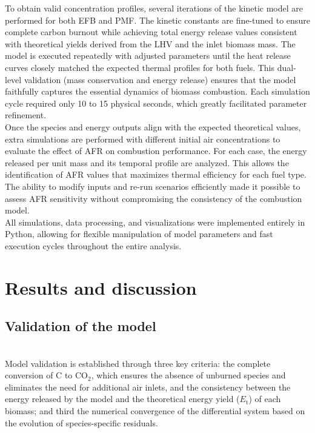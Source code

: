 \documentclass[preprint,12pt]{elsarticle}
\begin{document}
To obtain valid concentration profiles, several iterations of the kinetic model are performed for both EFB and PMF. The kinetic constants are fine-tuned to ensure complete carbon burnout while achieving total energy release values consistent with theoretical yields derived from the LHV and the inlet biomass mass. The model is executed repeatedly with adjusted parameters until the heat release curves closely matched the expected thermal profiles for both fuels. This dual-level validation (mass conservation and energy release) ensures that the model faithfully captures the essential dynamics of biomass combustion. Each simulation cycle required only 10 to 15 physical seconds, which greatly facilitated parameter refinement.\\

Once the species and energy outputs align with the expected theoretical values, extra simulations are performed with different initial air concentrations to evaluate the effect of AFR on combustion performance. For each case, the energy released per unit mass and its temporal profile are analyzed. This allows the identification of AFR values that maximizes thermal efficiency for each fuel type. The ability to modify inputs and re-run scenarios efficiently made it possible to assess AFR sensitivity without compromising the consistency of the combustion model.\\

All simulations, data processing, and visualizations were implemented entirely in Python, allowing for flexible manipulation of model parameters and fast execution cycles throughout the entire analysis.

\section{Results and discussion}
\label{results}
\subsection{Validation of the model}
\label{Validation of the model}\\


Model validation is established through three key criteria: the complete conversion of C to CO$_2$, which ensures the absence of unburned species and eliminates the need for additional air inlets, and the consistency between the energy released by the model and the theoretical energy yield ($E_{\text{t}}$) of each biomass; and third the numerical convergence of the differential system based on the evolution of species-specific residuals. \\
\end{document}
